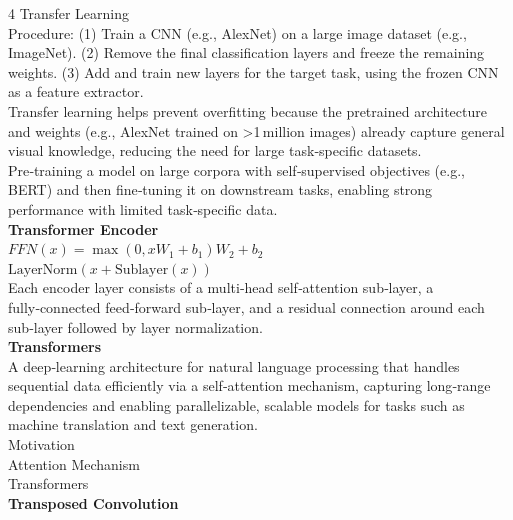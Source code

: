 \documentclass[8pt]{extarticle}
\begin{document}
\begin{multicols}{4}
Transfer Learning\\
Procedure: (1) Train a CNN (e.g., AlexNet) on a large image dataset (e.g., ImageNet). (2) Remove the final classification layers and freeze the remaining weights. (3) Add and train new layers for the target task, using the frozen CNN as a feature extractor.\\
Transfer learning helps prevent overfitting because the pretrained architecture and weights (e.g., AlexNet trained on >1 million images) already capture general visual knowledge, reducing the need for large task‑specific datasets.\\
Pre‑training a model on large corpora with self‑supervised objectives (e.g., BERT) and then fine‑tuning it on downstream tasks, enabling strong performance with limited task‑specific data.\\
\vspace{2pt}\textbf{Transformer Encoder}\\
$FFN(x) = \max(0, x W_{1} + b_{1}) W_{2} + b_{2}$\\
$\text{LayerNorm}(x + \text{Sublayer}(x))$\\
Each encoder layer consists of a multi‑head self‑attention sub‑layer, a fully‑connected feed‑forward sub‑layer, and a residual connection around each sub‑layer followed by layer normalization.\\
\vspace{2pt}\textbf{Transformers}\\
A deep‑learning architecture for natural language processing that handles sequential data efficiently via a self‑attention mechanism, capturing long‑range dependencies and enabling parallelizable, scalable models for tasks such as machine translation and text generation.\\
Motivation\\
Attention Mechanism\\
Transformers\\
\vspace{2pt}\textbf{Transposed Convolution}\\


\end{multicols}
\end{document}
